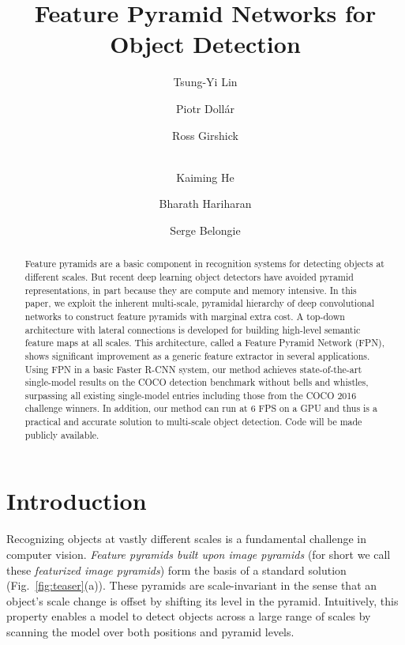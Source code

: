 \documentclass[10pt,twocolumn,letterpaper]{article}
\begin{document}
\title{Feature Pyramid Networks for Object Detection\vspace{-2mm}}

\author[1,2]{Tsung-Yi Lin}
\author[1]{Piotr  Doll\'ar}
\author[1]{Ross Girshick}
\author[1]{\\Kaiming He}
\author[1]{Bharath Hariharan}
\author[2]{Serge Belongie}

\maketitle

\begin{abstract}
Feature pyramids are a basic component in recognition systems for detecting objects at different scales.
But recent deep learning object detectors have avoided pyramid representations, in part because they are compute and memory intensive.
In this paper, we exploit the inherent multi-scale, pyramidal hierarchy of deep convolutional networks to construct feature pyramids with marginal extra cost.
A top-down architecture with lateral connections is developed for building high-level semantic feature maps at all scales.
This architecture, called a Feature Pyramid Network (FPN), shows significant improvement as a generic feature extractor in several applications. 
Using FPN in a basic Faster R-CNN system, our method achieves state-of-the-art single-model results on the COCO detection benchmark without bells and whistles, surpassing all existing single-model entries including those from the COCO 2016 challenge winners.
In addition, our method can run at 6 FPS on a GPU and thus is a practical and accurate solution to multi-scale object detection. Code will be made publicly available.
\end{abstract}

\section{Introduction}

Recognizing objects at vastly different scales is a fundamental challenge in computer vision.
\emph{Feature pyramids built upon image pyramids} (for short we call these \emph{featurized image pyramids}) form the basis of a standard solution \cite{Adelson1984} (Fig.~\ref{fig:teaser}(a)).
These pyramids are scale-invariant in the sense that an object's scale change is offset by shifting its level in the pyramid.
Intuitively, this property enables a model to detect objects across a large range of scales by scanning the model over both positions and pyramid levels.
\end{document}

